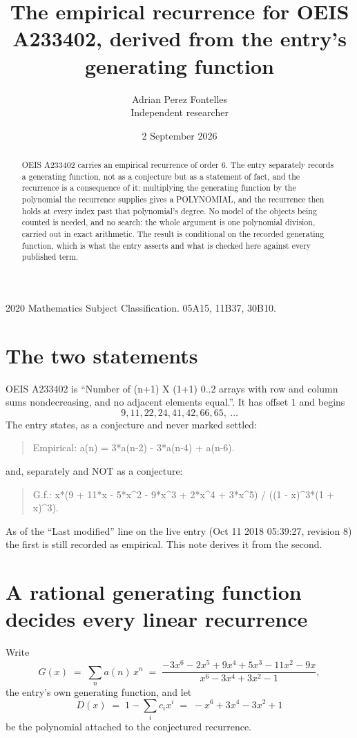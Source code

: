 \documentclass[11pt,a4paper]{article}
\title{The empirical recurrence for OEIS A233402, derived from the entry's generating function}
\author{Adrian Perez Fontelles\\ \small Independent researcher}
\date{2 September 2026}
\theoremstyle{plain}
\theoremstyle{definition}
\begin{document}
\maketitle

\begin{abstract}
OEIS A233402 carries an empirical recurrence of order $6$. The entry separately records a
generating function, not as a conjecture but as a statement of fact, and the recurrence is a
consequence of it: multiplying the generating function by the polynomial the recurrence
supplies gives a POLYNOMIAL, and the recurrence then holds at every index past that
polynomial's degree. No model of the objects being counted is needed, and no search: the
whole argument is one polynomial division, carried out in exact arithmetic. The result is
conditional on the recorded generating function, which is what the entry asserts and what is
checked here against every published term.
\end{abstract}

\noindent\small 2020 Mathematics Subject Classification. 05A15, 11B37, 30B10.\normalsize

\section{The two statements}

OEIS A233402 is ``Number of (n+1) X (1+1) 0..2 arrays with row and column sums nondecreasing, and no adjacent elements equal.''. It has offset $1$ and begins
\[
9, 11, 22, 24, 41, 42, 66, 65,\ \dots
\]
The entry states, as a conjecture and never marked settled:
\begin{quote}
Empirical: a(n) = 3*a(n-2) - 3*a(n-4) + a(n-6).
\end{quote}
and, separately and NOT as a conjecture:
\begin{quote}
G.f.: x*(9 + 11*x - 5*x\^{}2 - 9*x\^{}3 + 2*x\^{}4 + 3*x\^{}5) / ((1 - x)\^{}3*(1 + x)\^{}3).
\end{quote}
As of the ``Last modified'' line on the live entry (Oct 11 2018 05:39:27, revision 8) the first is still
recorded as empirical. This note derives it from the second.

\section{A rational generating function decides every linear recurrence}

Write
\[
G(x)\;=\;\sum_{n}a(n)\,x^{n}\;=\;\frac{- 3 x^{6} - 2 x^{5} + 9 x^{4} + 5 x^{3} - 11 x^{2} - 9 x}{x^{6} - 3 x^{4} + 3 x^{2} - 1},
\]
the entry's own generating function, and let
\[
D(x)\;=\;1-\sum_i c_i x^{i}\;=\;- x^{6} + 3 x^{4} - 3 x^{2} + 1
\]
be the polynomial attached to the conjectured recurrence.
\end{document}
